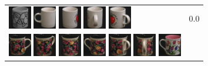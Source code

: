 \begin{figure}[tbp]
\begin{center}
\begin{tabular}{m{11cm} | m{3cm} |}
\includegraphics[width=1cm]{coil/beeld-52.eps}
\includegraphics[width=1cm]{coil/beeld-37.eps}
\includegraphics[width=1cm]{coil/beeld-38.eps}
\includegraphics[width=1cm]{coil/beeld-41.eps}
\includegraphics[width=1cm]{coil/beeld-40.eps}
& {\scriptsize 0.0}
\\
\includegraphics[width=1cm]{coil/beeld-60.eps}
\includegraphics[width=1cm]{coil/beeld-63.eps}
\includegraphics[width=1cm]{coil/beeld-62.eps}
\includegraphics[width=1cm]{coil/beeld-61.eps}
\includegraphics[width=1cm]{coil/beeld-64.eps}
\includegraphics[width=1cm]{coil/beeld-65.eps}
\includegraphics[width=1cm]{coil/beeld-7.eps}

\end{tabular}
\end{center}
\end{figure}
